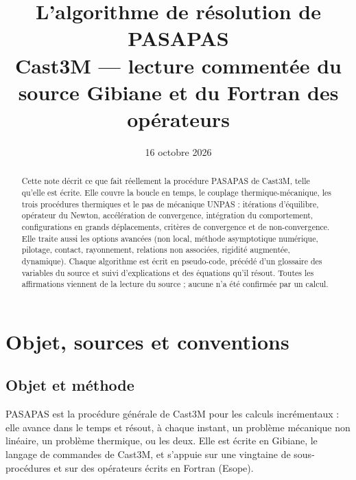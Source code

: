 \documentclass[11pt,a4paper]{article}
\title{\sffamily\bfseries L'algorithme de résolution de PASAPAS\\[0.3em]
  \large\mdseries Cast3M — lecture commentée du source Gibiane et du Fortran des opérateurs}
\author{}
\date{16 octobre 2026}
\numberwithin{equation}{section}
\newcommand{\pr}[1]{\textsf{#1}}                        %
\begin{document}
\maketitle
\thispagestyle{empty}

\begin{abstract}
\noindent Cette note décrit ce que fait réellement la procédure \pr{PASAPAS} de Cast3M, telle qu'elle est écrite.
Elle couvre la boucle en temps, le couplage thermique-mécanique, les trois procédures thermiques et le pas de mécanique \pr{UNPAS} : itérations d'équilibre, opérateur du Newton, accélération de convergence, intégration du comportement, configurations en grands déplacements, critères de convergence et de non-convergence.
Elle traite aussi les options avancées (non local, méthode asymptotique numérique, pilotage, contact, rayonnement, relations non associées, rigidité augmentée, dynamique).
Chaque algorithme est écrit en pseudo-code, précédé d'un glossaire des variables du source et suivi d'explications et des équations qu'il résout.
Toutes les affirmations viennent de la lecture du source ; aucune n'a été confirmée par un calcul.
\end{abstract}

\setcounter{tocdepth}{2}
\tableofcontents
\clearpage
\section{Objet, sources et conventions}

\subsection{Objet et méthode}

\pr{PASAPAS} est la procédure générale de Cast3M pour les calculs incrémentaux : elle avance dans le temps et résout, à chaque instant, un problème mécanique non linéaire, un problème thermique, ou les deux.
Elle est écrite en Gibiane, le langage de commandes de Cast3M, et s'appuie sur une vingtaine de sous-procédures et sur des opérateurs écrits en Fortran (Esope).
\end{document}
